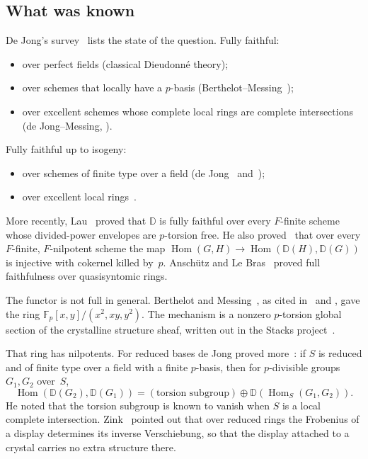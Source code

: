 \documentclass[11pt]{amsart}
\theoremstyle{remark}
\newcommand{\Fp}{\mathbb{F}_p}
\newcommand{\D}{\mathbb{D}}
\newcommand{\Hom}{\operatorname{Hom}}
\begin{document}
\subsection*{What was known}
De Jong's survey~\cite[pp.~260--261]{dJICM} lists the state of the question. Fully faithful:
\begin{itemize}
\item over perfect fields (classical Dieudonn\'e theory);
\item over schemes that locally have a $p$-basis (Berthelot--Messing~\cite{BM});
\item over excellent schemes whose complete local rings are complete intersections (de Jong--Messing,
  \cite[Thm.~4.6]{dJM}).
\end{itemize}
Fully faithful up to isogeny:
\begin{itemize}
\item over schemes of finite type over a field (de Jong~\cite[Cor.~5.1.2]{dJ95} and~\cite{dJM});
\item over excellent local rings~\cite{dJM}.
\end{itemize}
More recently, Lau~\cite[Cor.~1.7 = Thm.~7.9]{Lau} proved that $\D$ is fully faithful over every $F$-finite scheme
whose divided-power envelopes are $p$-torsion free. He also proved~\cite[Cor.~1.6 = Cor.~9.5]{Lau} that over every
$F$-finite, $F$-nilpotent scheme the map $\Hom(G,H)\to\Hom(\D(H),\D(G))$ is injective with cokernel killed by~$p$.
Anschütz and Le Bras~\cite{ALB} proved full faithfulness over quasisyntomic rings.

The functor is not full in general. Berthelot and Messing~\cite[4.4.1]{BM}, as cited in~\cite[p.~261, (x)]{dJICM} and
\cite[Rem.~3.4]{Lau}, gave the ring $\Fp[x,y]/(x^2,xy,y^2)$. The mechanism is a nonzero $p$-torsion global section of
the crystalline structure sheaf, written out in the Stacks project~\cite[Example~07LJ]{Stacks}.

That ring has nilpotents. For reduced bases de Jong proved more~\cite[Main Thm.~2 = Thm.~5.1.1]{dJ95}: if $S$ is
reduced and of finite type over a field with a finite $p$-basis, then for $p$-divisible groups $G_1,G_2$ over~$S$,
\[
\Hom(\D(G_2),\D(G_1))=(\text{torsion subgroup})\oplus\D(\Hom_S(G_1,G_2)).
\]
He noted that the torsion subgroup is known to vanish when $S$ is a local complete intersection. Zink~\cite[p.~2]{Zink}
pointed out that over reduced rings the Frobenius of a display determines its inverse Verschiebung, so that the display
attached to a crystal carries no extra structure there.
\end{document}
